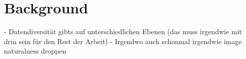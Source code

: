 \chapter{Background}


- Datendiversität gibts auf unterschiedlichen Ebenen (das muss irgendwie mit drin sein für den Rest der Arbeit)
- Irgendwo auch schonmal irgendwie image naturalness droppen